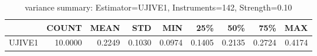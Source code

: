\begin{table}[ht]
\centering
\caption{variance summary: Estimator=UJIVE1, Instruments=142, Strength=0.10}
\begin{tabular}{lrrrrrrrr}
\toprule
 & COUNT & MEAN & STD & MIN & 25\% & 50\% & 75\% & MAX \\
\midrule
UJIVE1 & 10.0000 & 0.2249 & 0.1030 & 0.0974 & 0.1405 & 0.2135 & 0.2724 & 0.4174 \\
\bottomrule
\end{tabular}
\end{table}
